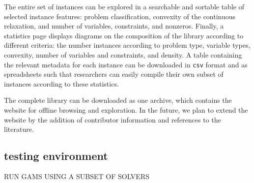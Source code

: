 The entire set of instances can be explored in a searchable and sortable table of selected instance features: problem
classification, convexity of the continuous relaxation, and number of variables, constraints, and nonzeros.
%
Finally, a statistics page displays diagrams on the composition of the library according to different criteria: the
number instances according to problem type, variable types, convexity, number of variables and constraints, and density.
%
A table containing the relevant metadata for each instance can be downloaded in \texttt{csv} format and as spreadsheets
such that researchers can easily compile their own subset of instances according to these statistics.


The complete library can be downloaded as one archive, which contains the website for offline browsing and exploration.  
%
In the future, we plan to extend the website by the addition of contributor information and references to the literature.


\subsection{testing environment}
RUN GAMS USING A SUBSET OF SOLVERS

